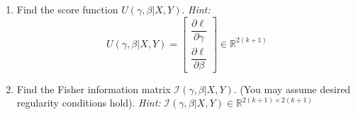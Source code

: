 \documentclass[11pt]{article}
\begin{document}
\begin{enumerate}
\begin{enumerate}
\item Find the score function $U(\gamma, \beta | X, Y)$. \textit{Hint:} 
$$U(\gamma, \beta | X, Y) = \begin{bmatrix}
\dfrac{\partial \ell}{\partial \gamma} \\
\dfrac{\partial \ell}{\partial \beta}
\end{bmatrix} \in \mathbb{R}^{2(k+1)}$$

\item  Find the Fisher information matrix $\mathcal{I}(\gamma, \beta | X, Y)$. (You may assume desired regularity conditions hold). \textit{Hint:} $\mathcal{I}(\gamma, \beta | X, Y) \in \mathbb{R}^{2(k+1) \times 2(k+1)}$
\end{enumerate}

\end{enumerate}
\end{document}
